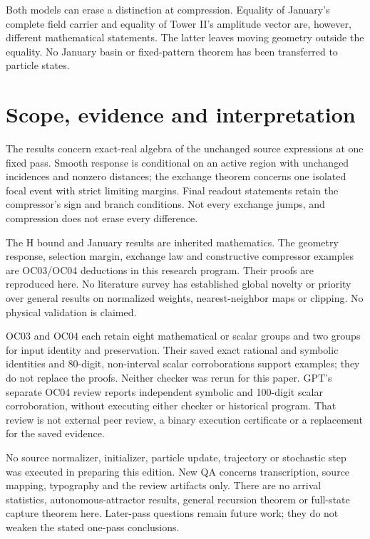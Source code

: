 \documentclass[11pt,a4paper]{article}
\theoremstyle{remark}\newtheorem{remark}[theorem]{Remark}
\numberwithin{equation}{section}
\begin{document}
Both models can erase a distinction at compression. Equality of January's
complete field carrier and equality of Tower II's amplitude vector are,
however, different mathematical statements. The latter leaves moving
geometry outside the equality. No January basin or fixed-pattern theorem
has been transferred to particle states.

\section{Scope, evidence and interpretation}\label{sec:limits}

The results concern exact-real algebra of the unchanged source expressions
at one fixed pass. Smooth response is conditional on an active region with
unchanged incidences and nonzero distances; the exchange theorem concerns
one isolated focal event with strict limiting margins. Final readout
statements retain the compressor's sign and branch conditions.
Not every exchange jumps, and compression does not erase every difference.

The H bound and January results are inherited mathematics. The geometry
response, selection margin, exchange law and constructive compressor examples
are OC03/OC04 deductions in this research program. Their proofs are reproduced
here. No literature survey has established global novelty or priority over
general results on normalized weights, nearest-neighbor maps or clipping.
No physical validation is claimed.

OC03 and OC04 each retain eight mathematical or scalar groups and two
groups for input identity and preservation. Their saved exact rational and symbolic
identities and 80-digit, non-interval scalar corroborations support examples;
they do not replace the proofs. Neither checker was rerun for this paper.
GPT's separate OC04 review reports independent symbolic and 100-digit
scalar corroboration, without executing either checker or historical program.
That review is not external peer review, a binary execution certificate or
a replacement for the saved evidence.

No source normalizer, initializer, particle update, trajectory or stochastic
step was executed in preparing this edition. New QA concerns transcription,
source mapping, typography and the review artifacts only.
There are no arrival statistics, autonomous-attractor results, general
recursion theorem or full-state capture theorem here.
Later-pass questions remain future work; they do not weaken the stated
one-pass conclusions.
\end{document}
